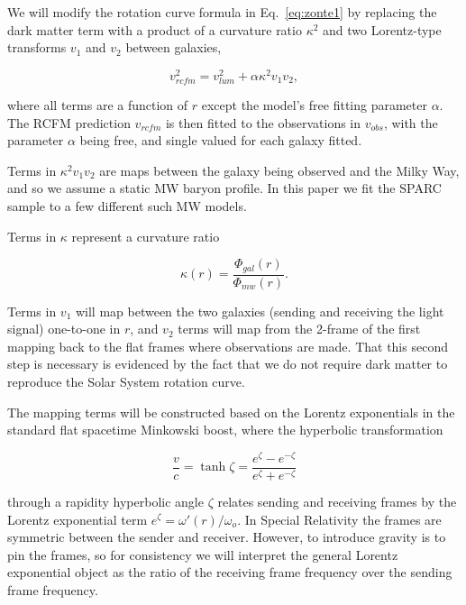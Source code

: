 \documentclass[reprint,%
 amsmath,amssymb,
 aps,
]{revtex4-1}
\begin{document}
We will modify
the rotation curve formula in Eq.~\ref{eq:zonte1} by replacing the dark matter term with a product  of a curvature ratio $\kappa^2$ and two Lorentz-type transforms     $v_1$ and $v_2$ between galaxies,   

\begin{equation}
v_{rcfm}^2 =  v_{lum}^2+\alpha \kappa^2 v_{1}v_{2}, 
\label{eq:zonteLCM}
\end{equation}  

 where all terms   are a function of $r$ except the model's free fitting parameter $\alpha$. 
The  RCFM  prediction $v_{rcfm}$ is then fitted to the observations in $v_{obs}$,   with the     parameter $\alpha$ being free, and single valued for each galaxy    fitted. 

Terms in $ \kappa^2 v_{1}v_{2}$ are   maps between the galaxy being observed and the Milky Way, and so we   assume a static MW baryon profile. In this paper we fit the SPARC sample to  a few different such MW models. 



 Terms in $\kappa$ 
 represent a  
curvature ratio  

 \begin{equation}
\kappa(r)=\frac{\Phi_{gal}(r)}{\Phi_{mw}(r)}.  
\label{eq:kappa2}  
\end{equation}  
 
 
Terms in $v_1$   will  map between the two galaxies (sending and receiving the light signal) one-to-one in $r$, and $v_2$ terms will map from the 2-frame of the first mapping back to the flat frames where observations are made. That this second step is necessary is evidenced by the fact that we do not require dark matter to reproduce the Solar System rotation curve.  

 The mapping terms will be constructed based on the 
 Lorentz exponentials in the   standard flat spacetime  Minkowski boost, 
 where   the  hyperbolic  transformation  

     \begin{equation}
         \frac{v}{c} = \tanh \zeta = \frac{e^\zeta - e^{-\zeta}}{e^\zeta + e^{-\zeta}}   
         \label{boost}
     \end{equation} 

 through a rapidity hyperbolic angle $\zeta$ relates sending and receiving frames by  the
    Lorentz exponential term  $e^\zeta = \omega'(r) /\omega_o$. In Special Relativity the frames are   symmetric between the sender and receiver. However, to introduce gravity is to pin the frames, so for consistency we will interpret the general Lorentz exponential object as the ratio of the receiving frame frequency over the   sending frame frequency.  
 
\end{document}
